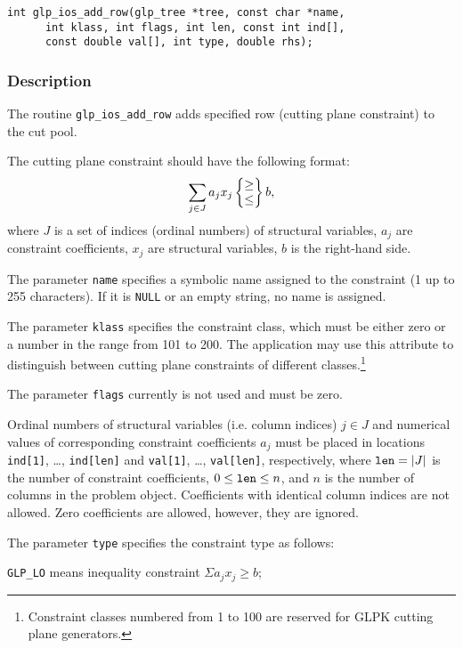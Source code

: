 \begin{verbatim}
int glp_ios_add_row(glp_tree *tree, const char *name,
      int klass, int flags, int len, const int ind[],
      const double val[], int type, double rhs);
\end{verbatim}

\subsubsection*{Description}

The routine \verb|glp_ios_add_row| adds specified row (cutting plane
constraint) to the cut pool.

The cutting plane constraint should have the following format:
$$\sum_{j\in J}a_jx_j\left\{\begin{array}{@{}c@{}}\geq\\\leq\\
\end{array}\right\}b,$$
where $J$ is a set of indices (ordinal numbers) of structural variables,
$a_j$ are constraint coefficients, $x_j$ are structural variables, $b$
is the right-hand side.

The parameter \verb|name| specifies a symbolic name assigned to the
constraint (1 up to 255 characters). If it is \verb|NULL| or an empty
string, no name is assigned.

The parameter \verb|klass| specifies the constraint class, which must
be either zero or a number in the range from 101 to 200. The application
may use this attribute to distinguish between cutting plane constraints
of different classes.\footnote{Constraint classes numbered from 1 to 100
are reserved for GLPK cutting plane generators.}

The parameter \verb|flags| currently is not used and must be zero.

Ordinal numbers of structural variables (i.e. column indices) $j\in J$
and numerical values of corresponding constraint coefficients $a_j$ must
be placed in locations \verb|ind[1]|, \dots, \verb|ind[len]| and
\verb|val[1]|, \dots, \verb|val[len]|, respectively, where
${\tt len}=|J|$ is the number of constraint coefficients,
$0\leq{\tt len}\leq n$, and $n$ is the number of columns in the problem
object. Coefficients with identical column indices are not allowed.
Zero coefficients are allowed, however, they are ignored.

The parameter \verb|type| specifies the constraint type as follows:

\verb|GLP_LO| means inequality constraint $\Sigma a_jx_j\geq b$;


